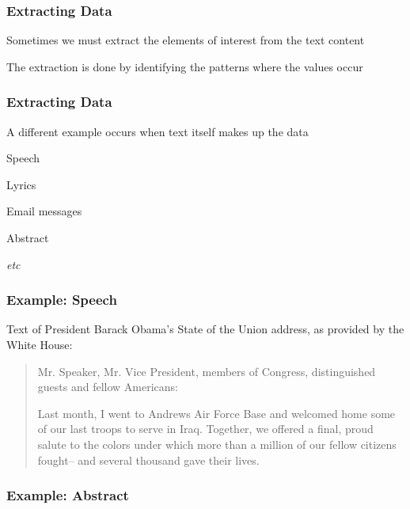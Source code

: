 \documentclass[12pt]{beamer}\usepackage[]{graphicx}\usepackage[]{color}
\begin{document}

\begin{frame}
\frametitle{Extracting Data}

\bbi
  \item Sometimes we must extract the elements of interest from the text content
  \item The extraction is done by identifying the patterns where the values occur
\ei

\end{frame}


\begin{frame}
\frametitle{Extracting Data}

\bi
  \item A different example occurs when text itself makes up the data
  \item Speech
  \item Lyrics
  \item Email messages
  \item Abstract
  \item \textit{etc}
\ei

\end{frame}


\begin{frame}[fragile]
\frametitle{Example: Speech}

{\small Text of President Barack Obama's State of the Union address, as provided by the White House:

\begin{quotation}
Mr. Speaker, Mr. Vice President, members of Congress, distinguished guests and fellow Americans:

Last month, I went to Andrews Air Force Base and welcomed home some of our last troops to serve in Iraq. Together, we offered a final, proud salute to the colors under which more than a million of our fellow citizens fought-- and several thousand gave their lives.
\end{quotation}
}

\end{frame}


\begin{frame}
\frametitle{Example: Abstract}
\begin{center}
\end{center}
\end{frame}
\end{document}
